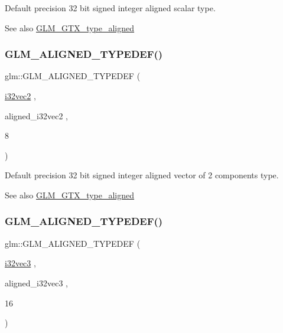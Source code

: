 Default precision 32 bit signed integer aligned scalar type. \begin{DoxySeeAlso}{See also}
\mbox{\hyperlink{group__gtx__type__aligned}{G\+L\+M\+\_\+\+G\+T\+X\+\_\+type\+\_\+aligned}} 
\end{DoxySeeAlso}
\mbox{\label{group__gtx__type__aligned_gaf90651cf2f5e7ee2b11cfdc5a6749534}} 
\subsubsection{\texorpdfstring{GLM\_ALIGNED\_TYPEDEF()}{GLM\_ALIGNED\_TYPEDEF()}\hspace{0.1cm}{\footnotesize\ttfamily [62/209]}}
{\footnotesize\ttfamily glm\+::\+G\+L\+M\+\_\+\+A\+L\+I\+G\+N\+E\+D\+\_\+\+T\+Y\+P\+E\+D\+EF (\begin{DoxyParamCaption}\item[{\mbox{\hyperlink{group__gtc__type__precision_ga25820e641988fe33b075d80434872d02}{i32vec2}}}]{,  }\item[{aligned\+\_\+i32vec2}]{,  }\item[{8}]{ }\end{DoxyParamCaption})}

Default precision 32 bit signed integer aligned vector of 2 components type. \begin{DoxySeeAlso}{See also}
\mbox{\hyperlink{group__gtx__type__aligned}{G\+L\+M\+\_\+\+G\+T\+X\+\_\+type\+\_\+aligned}} 
\end{DoxySeeAlso}
\mbox{\label{group__gtx__type__aligned_ga7354a4ead8cb17868aec36b9c30d6010}} 
\subsubsection{\texorpdfstring{GLM\_ALIGNED\_TYPEDEF()}{GLM\_ALIGNED\_TYPEDEF()}\hspace{0.1cm}{\footnotesize\ttfamily [63/209]}}
{\footnotesize\ttfamily glm\+::\+G\+L\+M\+\_\+\+A\+L\+I\+G\+N\+E\+D\+\_\+\+T\+Y\+P\+E\+D\+EF (\begin{DoxyParamCaption}\item[{\mbox{\hyperlink{group__gtc__type__precision_gab67e08f6a4b1bce82a9a34ecb2bfba64}{i32vec3}}}]{,  }\item[{aligned\+\_\+i32vec3}]{,  }\item[{16}]{ }\end{DoxyParamCaption})}

